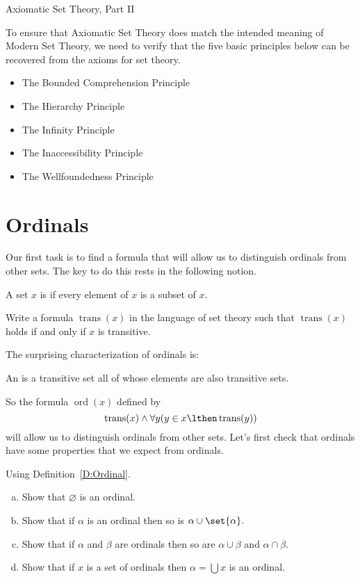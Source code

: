 \begin{unit}{Axiomatic Set Theory, Part II}

To ensure that Axiomatic Set Theory does match the intended meaning of Modern Set Theory, we need to verify that the five basic principles below can be recovered from the axioms for set theory.
\begin{itemize}
\item[] The Bounded Comprehension Principle
\item[] The Hierarchy Principle
\item[] The Infinity Principle
\item[] The Inaccessibility Principle
\item[] The Wellfoundedness Principle
\end{itemize}

\section{Ordinals}

Our first task is to find a formula that will allow us to distinguish ordinals from other sets.
The key to do this rests in the following notion.

\begin{definition}\label{D:Transitive}
  A set \(x\) is  if every element of \(x\) is a subset of \(x.\)
\end{definition}

\begin{problem}
  Write a formula \(\operatorname{trans}(x)\) in the language of set theory such that \(\operatorname{trans}(x)\) holds if and only if \(x\) is transitive.
\end{problem}

\noindent
The surprising characterization of ordinals is:

\begin{definition}\label{D:Ordinal}
  An  is a transitive set all of whose elements are also transitive sets.
\end{definition}

\noindent
So the formula \(\operatorname{ord}(x)\) defined by \[\operatorname{trans}(x) \land \forall y(y \in x \lthen \operatorname{trans}(y))\] will allow us to distinguish ordinals from other sets.
Let's first check that ordinals have some properties that we expect from ordinals.

\begin{problem}
  Using Definition~\ref{D:Ordinal}.
  \begin{enumerate}[(a)]
  \item Show that \(\varnothing\) is an ordinal.
  \item Show that if \(\alpha\) is an ordinal then so is \(\alpha \cup \set{\alpha}.\)
  \item Show that if \(\alpha\) and \(\beta\) are ordinals then so are \(\alpha \cup \beta\) and \(\alpha \cap \beta.\)
  \item Show that if \(x\) is a set of ordinals then \(\alpha = \bigcup x\) is an ordinal.
  \end{enumerate}
\end{problem}


\end{unit}
